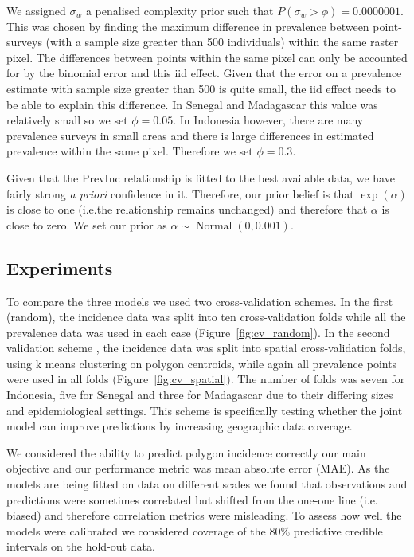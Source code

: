 \documentclass{statsoc}
\begin{document}
We assigned $\sigma_w$ a penalised complexity prior such that $P(\sigma_w > \phi) = 0.0000001$. 
This was chosen by finding the maximum difference in prevalence between point-surveys (with a sample size greater than 500 individuals) within the same raster pixel.
The differences between points within the same pixel can only be accounted for by the binomial error and this iid effect.
Given that the error on a prevalence estimate with sample size greater than 500 is quite small, the iid effect needs to be able to explain this difference.
In Senegal and Madagascar this value was relatively small so we set $\phi = 0.05$. 
In Indonesia however, there are many prevalence surveys in small areas and there is large differences in estimated prevalence within the same pixel.
Therefore we set $\phi = 0.3$.

Given that the PrevInc relationship is fitted to the best available data, we have fairly strong \emph{a priori} confidence in it.
Therefore, our prior belief is that $\exp(\alpha)$ is close to one (i.e.\thinspace the relationship remains unchanged) and therefore that $\alpha$ is close to zero.
We set our prior as $\alpha \sim \operatorname{Normal}(0, 0.001)$.


\subsection*{Experiments}

To compare the three models we used two cross-validation schemes. 
In the first (random), the incidence data was split into ten cross-validation folds while all the prevalence data was used in each case (Figure~\ref{fig:cv_random}). 
In the second validation scheme , the incidence data was split into spatial cross-validation folds, using k means clustering on polygon centroids, while again all prevalence points were used in all folds (Figure~\ref{fig:cv_spatial}).
The number of folds was seven for Indonesia, five for Senegal and three for Madagascar due to their differing sizes and epidemiological settings.
This scheme is specifically testing whether the joint model can improve predictions by increasing geographic data coverage.


We considered the ability to predict polygon incidence correctly our main objective and our performance metric was mean absolute error (MAE).
As the models are being fitted on data on different scales we found that observations and predictions were sometimes correlated but shifted from the one-one line (i.e. biased) and therefore correlation metrics were misleading.
To assess how well the models were calibrated we considered coverage of the 80\% predictive credible intervals on the hold-out data.
\end{document}
